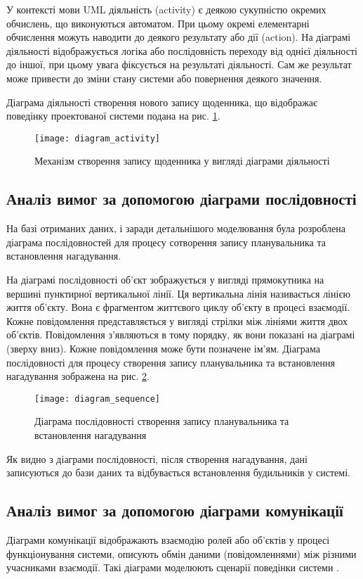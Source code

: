 \documentclass[../main.tex]{subfiles}
\begin{document}
У контексті мови UML діяльність (activity) є деякою сукупністю окремих обчислень, що виконуються автоматом. При цьому окремі елементарні обчислення можуть наводити до деякого результату або дії (action). На діаграмі діяльності відображується логіка або послідовність переходу від однієї діяльності до іншої, при цьому увага фіксується на результаті діяльності. Сам же результат може привести до зміни стану системи або повернення деякого значення.

Діаграма діяльності створення нового запису щоденника, що відображає поведінку проектованої системи подана на рис. \ref{diagram:2.2}.

\begin{figure}[H]
	\centering
	\texttt{[image: diagram\_activity]}
	\caption{Механізм створення запису щоденника у вигляді діаграми діяльності}
	\label{diagram:2.2}
\end{figure}

\subsection{Аналіз вимог за допомогою діаграми послідовності}
На базі отриманих даних, і заради детальнішого моделювання була розроблена діаграма послідовностей для процесу сотворення запису планувальника та встановлення нагадування.

На діаграмі послідовності об’єкт зображується у вигляді прямокутника на вершині пунктирної вертикальної лінії. Ця вертикальна лінія називається лінією життя об’єкту. Вона є фрагментом життєвого циклу об’єкту в процесі взаємодії. Кожне повідомлення представляється у вигляді стрілки між лініями життя двох об’єктів. Повідомлення з’являються в тому порядку, як вони показані на діаграмі (зверху вниз). Кожне повідомлення може бути позначене ім’ям.
Діаграма послідовності для процесу створення запису планувальника та встановлення нагадування зображена на рис. \ref{diagram:2.3}.

\begin{figure}[H]
	\centering
	\texttt{[image: diagram\_sequence]}
	\caption{Діаграма послідовності створення запису планувальника та встановлення нагадування}
	\label{diagram:2.3}
\end{figure}

Як видно з діаграми послідовності, після створення нагадування, дані записуються до бази даних та відбувається встановлення будильників у системі. 

\subsection{Аналіз вимог за допомогою діаграми комунікації}
Діаграми комунікації відображають взаємодію ролей або об'єктів у процесі функціонування системи, описують обмін даними (повідомленнями) між різними учасниками взаємодії. Такі діаграми моделюють сценарії поведінки системи \cite{diploma_guidelines}. 
\end{document}
